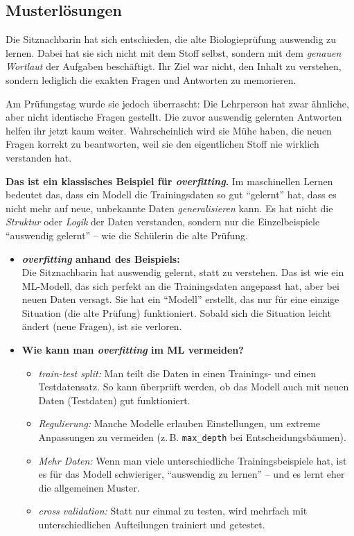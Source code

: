 \subsection*{Musterlösungen}

\begin{aufgabe}{1}

Die Sitznachbarin hat sich entschieden, die alte Biologieprüfung auswendig zu lernen. Dabei hat sie sich nicht mit dem Stoff selbst, sondern mit dem \emph{genauen Wortlaut} der Aufgaben beschäftigt. Ihr Ziel war nicht, den Inhalt zu verstehen, sondern lediglich die exakten Fragen und Antworten zu memorieren.

Am Prüfungstag wurde sie jedoch überrascht: Die Lehrperson hat zwar ähnliche, aber nicht identische Fragen gestellt. Die zuvor auswendig gelernten Antworten helfen ihr jetzt kaum weiter. Wahrscheinlich wird sie Mühe haben, die neuen Fragen korrekt zu beantworten, weil sie den eigentlichen Stoff nie wirklich verstanden hat.

\textbf{Das ist ein klassisches Beispiel für \textit{overfitting}.} Im maschinellen Lernen bedeutet das, dass ein Modell die Trainingsdaten so gut ``gelernt'' hat, dass es nicht mehr auf neue, unbekannte Daten \textit{generalisieren} kann. Es hat nicht die \textit{Struktur} oder \textit{Logik} der Daten verstanden, sondern nur die Einzelbeispiele ``auswendig gelernt'' – wie die Schülerin die alte Prüfung.

\begin{itemize}
  \item \textbf{\textit{overfitting} anhand des Beispiels:}\\
  Die Sitznachbarin hat auswendig gelernt, statt zu verstehen. Das ist wie ein ML-Modell, das sich perfekt an die Trainingsdaten angepasst hat, aber bei neuen Daten versagt. Sie hat ein ``Modell'' erstellt, das nur für eine einzige Situation (die alte Prüfung) funktioniert. Sobald sich die Situation leicht ändert (neue Fragen), ist sie verloren.

  \item \textbf{Wie kann man \textit{overfitting} im ML vermeiden?}\\
  \begin{itemize}
    \item \textit{train-test split:} Man teilt die Daten in einen Trainings- und einen Testdatensatz. So kann überprüft werden, ob das Modell auch mit neuen Daten (Testdaten) gut funktioniert.
    \item \textit{Regulierung:} Manche Modelle erlauben Einstellungen, um extreme Anpassungen zu vermeiden (z.\,B. \texttt{max\_depth} bei Entscheidungsbäumen).
    \item \textit{Mehr Daten:} Wenn man viele unterschiedliche Trainingsbeispiele hat, ist es für das Modell schwieriger, ``auswendig zu lernen'' – und es lernt eher die allgemeinen Muster.
    \item \textit{cross validation:} Statt nur einmal zu testen, wird mehrfach mit unterschiedlichen Aufteilungen trainiert und getestet.
  \end{itemize}
\end{itemize}

\end{aufgabe}


